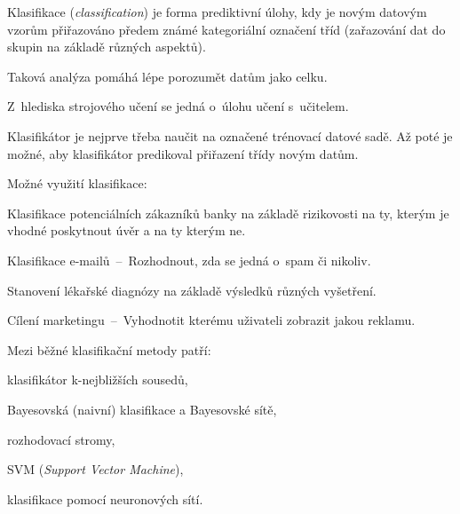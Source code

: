 \begin{compactitem}
    \item Klasifikace (\textit{classification}) je forma prediktivní úlohy, kdy je novým datovým vzorům přiřazováno předem známé kategoriální označení tříd (zařazování dat do skupin na základě různých aspektů).

    \item Taková analýza pomáhá lépe porozumět datům jako celku.

    \item Z~hlediska strojového učení se jedná o~úlohu učení s~učitelem.

    \item Klasifikátor je nejprve třeba naučit na označené trénovací datové sadě. Až poté je možné, aby klasifikátor predikoval přiřazení třídy novým datům.

    \item Možné využití klasifikace: \begin{compactitem}
        \item Klasifikace potenciálních zákazníků banky na základě rizikovosti na ty, kterým je vhodné poskytnout úvěr a na ty kterým ne.

        \item Klasifikace e-mailů~--~Rozhodnout, zda se jedná o~spam či nikoliv.

        \item Stanovení lékařské diagnózy na základě výsledků různých vyšetření.

        \item Cílení marketingu~--~Vyhodnotit kterému uživateli zobrazit jakou reklamu.
    \end{compactitem}

    \item Mezi běžné klasifikační metody patří:

    \begin{compactitem}
        \item klasifikátor k-nejbližších sousedů,

        \item Bayesovská (naivní) klasifikace a Bayesovské sítě,

        \item rozhodovací stromy,

        \item SVM (\textit{Support Vector Machine}),

        \item klasifikace pomocí neuronových sítí.
    \end{compactitem}
\end{compactitem}

